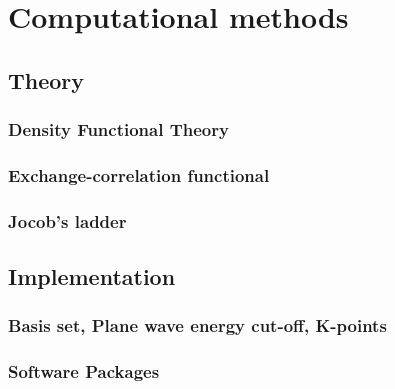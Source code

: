 
\chapter{Computational methods \label{chap:2}}

\ifpdf
    \graphicspath{{Chapter2/Figs/Raster/}{Chapter2/Figs/PDF/}{Chapter2/Figs/}}
\else
    \graphicspath{{Chapter2/Figs/Vector/}{Chapter2/Figs/}}
\fi

\section{Theory}
\subsection{Density Functional Theory}
\subsection{Exchange-correlation functional}
\subsection{Jocob's ladder}
\section{Implementation}
\subsection{Basis set, Plane wave energy cut-off, K-points}
\subsection{Software Packages}